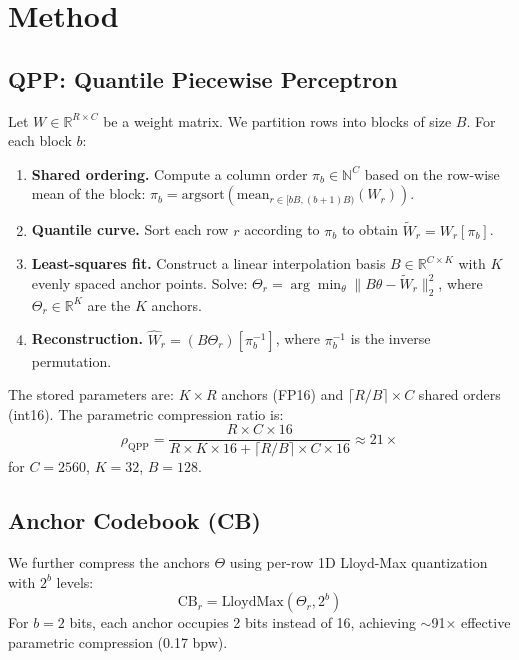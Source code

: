 \documentclass[11pt,a4paper]{article}
\begin{document}
\section{Method}

\subsection{QPP: Quantile Piecewise Perceptron}

Let $W \in \mathbb{R}^{R \times C}$ be a weight matrix. We partition rows into blocks of size $B$. For each block $b$:

\begin{enumerate}
\item \textbf{Shared ordering.} Compute a column order $\pi_b \in \mathbb{N}^C$ based on the row-wise mean of the block: $\pi_b = \text{argsort}(\text{mean}_{r \in [bB, (b+1)B)}(W_r))$.
\item \textbf{Quantile curve.} Sort each row $r$ according to $\pi_b$ to obtain $\tilde{W}_r = W_r[\pi_b]$.
\item \textbf{Least-squares fit.} Construct a linear interpolation basis $B \in \mathbb{R}^{C \times K}$ with $K$ evenly spaced anchor points. Solve: $\Theta_r = \arg\min_\theta \|B\theta - \tilde{W}_r\|_2^2$, where $\Theta_r \in \mathbb{R}^K$ are the $K$ anchors.
\item \textbf{Reconstruction.} $\hat{W}_r = (B\Theta_r)[\pi_b^{-1}]$, where $\pi_b^{-1}$ is the inverse permutation.
\end{enumerate}

The stored parameters are: $K \times R$ anchors (FP16) and $\lceil R/B \rceil \times C$ shared orders (int16). The parametric compression ratio is:
\begin{equation}
    \rho_{\text{QPP}} = \frac{R \times C \times 16}{R \times K \times 16 + \lceil R/B \rceil \times C \times 16} \approx 21\times
\end{equation}
for $C = 2560$, $K = 32$, $B = 128$.

\subsection{Anchor Codebook (CB)}

We further compress the anchors $\Theta$ using per-row 1D Lloyd-Max quantization with $2^b$ levels:
\begin{equation}
    \text{CB}_r = \text{LloydMax}(\Theta_r, 2^b)
\end{equation}
For $b = 2$ bits, each anchor occupies 2 bits instead of 16, achieving $\sim$91$\times$ effective parametric compression (0.17 bpw).
\end{document}
